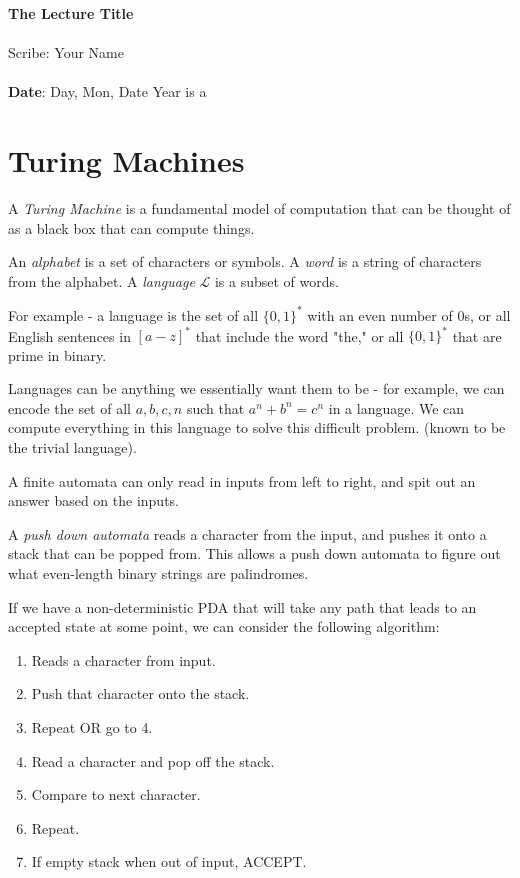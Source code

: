 \documentclass[11pt,twosided]{article}
\def\titlestring{The Lecture Title}
\def\scribestring{Your Name}
\def\datestring{Day, Mon, Date Year}
\begin{document}
\thispagestyle{plain}  %

\noindent
{\LARGE \textbf{\titlestring}}\\\\
%
{\Large Scribe: \scribestring}\\ \\
{\textbf{Date}: \datestring}
is a 

\noindent

\section{Turing Machines}

A \textit{Turing Machine} is a fundamental model of computation that can be thought of as a black box that can compute things. 

An \textit{alphabet} is a set of characters or symbols. 
A \textit{word} is a string of characters from the alphabet. 
A \textit{language} $\mathcal{L}$ is a subset of words. 

For example - a language is the set of all $\{0, 1\}^*$ with an even number of $0$s, or all English sentences in $[a-z ]^*$ that include the word "the," or all $\{0, 1\}^*$ that are prime in binary. 

Languages can be anything we essentially want them to be - for example, we can encode the set of all $a, b, c, n$ such that $a^n + b^n = c^n$ in a language. We can compute everything in this language to solve this difficult problem. (known to be the trivial language). 

A finite automata can only read in inputs from left to right, and spit out an answer based on the inputs. 

A \textit{push down automata} reads a character from the input, and pushes it onto a stack that can be popped from. This allows a push down automata to figure out what even-length binary strings are palindromes. 

If we have a non-deterministic PDA that will take any path that leads to an accepted state at some point, we can consider the following algorithm: 
\begin{enumerate}
\item Reads a character from input. 
\item Push that character onto the stack. 
\item Repeat OR go to 4. 
\item Read a character and pop off the stack. 
\item Compare to next character. 
\item Repeat. 
\item If empty stack when out of input, ACCEPT. 
\end{enumerate}
\end{document}
